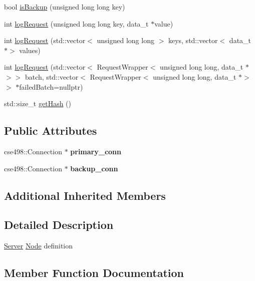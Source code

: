 \begin{DoxyCompactItemize}
\item 
bool \mbox{\hyperlink{classft_1_1Server_aae86da697b404a1337b94b2a1ee7d5ed}{is\+Backup}} (unsigned long long key)
\item 
int \mbox{\hyperlink{classft_1_1Server_a17e80f813ff788007ece482e5d311ffa}{log\+Request}} (unsigned long long key, data\+\_\+t $\ast$value)
\item 
int \mbox{\hyperlink{classft_1_1Server_ae97719e0790afb356374955130cb4c72}{log\+Request}} (std\+::vector$<$ unsigned long long $>$ keys, std\+::vector$<$ data\+\_\+t $\ast$$>$ values)
\item 
int \mbox{\hyperlink{classft_1_1Server_ada925516d776a241439217f7c0947c7b}{log\+Request}} (std\+::vector$<$ Request\+Wrapper$<$ unsigned long long, data\+\_\+t $\ast$$>$$>$ batch, std\+::vector$<$ Request\+Wrapper$<$ unsigned long long, data\+\_\+t $\ast$$>$$>$ $\ast$failed\+Batch=nullptr)
\item 
std\+::size\+\_\+t \mbox{\hyperlink{classft_1_1Server_aef123896c2f84d6bc2c5fe2940d1a8b4}{get\+Hash}} ()
\end{DoxyCompactItemize}
\subsection*{Public Attributes}
\begin{DoxyCompactItemize}
\item 
\mbox{\label{classft_1_1Server_abd5204ed28334489e0358975cd3e9f34}} 
cse498\+::\+Connection $\ast$ {\bfseries primary\+\_\+conn}
\item 
\mbox{\label{classft_1_1Server_ac99b52438e80a92645fcc6b6c57e2f6b}} 
cse498\+::\+Connection $\ast$ {\bfseries backup\+\_\+conn}
\end{DoxyCompactItemize}
\subsection*{Additional Inherited Members}


\subsection{Detailed Description}
\mbox{\hyperlink{classft_1_1Server}{Server}} \mbox{\hyperlink{classft_1_1Node}{Node}} definition 

\subsection{Member Function Documentation}
\mbox{\label{classft_1_1Server_a2458eef12718b2f04129a68ddea466c3}} 
